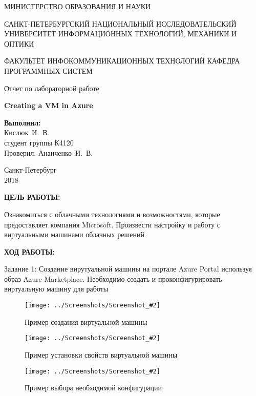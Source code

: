 \documentclass[14pt,a4paper]{extreport}
\newcommand{\screenshot}[2]{\begin{figure}[ht]%
\centering\texttt{[image: ../Screenshots/Screenshot\_\#2]}%
\caption{#1}%
\label{picture#2}%
\end{figure}%
}
\newcommand{\header}[1]{%
{
\fontsize{16pt}{14pt}\selectfont
\begin{center}
\textbf{\MakeUppercase{#1}:}
\end{center}
}
}
\newcommand{\prepod}{Ананченко~И.~В.}
\newcommand{\igork}{Кислюк~И.~В.}
\begin{document}
	\begin{titlepage}
	\begin{center}	
		\fontsize{14pt}{14pt}\selectfont
		МИНИСТЕРСТВО ОБРАЗОВАНИЯ И НАУКИ\\

		\vspace*{0.6\baselineskip}
		
		САНКТ-ПЕТЕРБУРГСКИЙ НАЦИОНАЛЬНЫЙ ИССЛЕДОВАТЕЛЬСКИЙ УНИВЕРСИТЕТ ИНФОРМАЦИОННЫХ ТЕХНОЛОГИЙ, МЕХАНИКИ И ОПТИКИ
		
		\vspace*{0.6\baselineskip}
		ФАКУЛЬТЕТ ИНФОКОММУНИКАЦИОННЫХ ТЕХНОЛОГИЙ
		КАФЕДРА ПРОГРАММНЫХ СИСТЕМ
	
		\vspace*{7\baselineskip}
		\fontsize{19pt}{18pt}\selectfont
		Отчет по лабораторной работе
		
		\fontsize{20pt}{18pt}\selectfont
		\textbf{Creating a VM in Azure}\\
		\vspace*{1.15\baselineskip}
		\end{center}
	
	\vspace*{2\baselineskip}
	\begin{flushright}
	\fontsize{14pt}{14pt}\selectfont
	\textbf{Выполнил:}\\
	\igork\\
	студент группы К4120\\
	Проверил: \prepod\\
	\end{flushright}
	
	\vspace{\fill}
	\begin{center}
	Санкт-Петербург\\
	2018
	\end{center}
	
\end{titlepage}

\newpage

\header{Цель работы}

\fontsize{14pt}{14pt}\selectfont

Ознакомиться с облачными технологиями и возможностями, которые предоставляет компания Microsoft. Произвести настройку и работу с виртуальными машинами облачных решений
\clearpage

\header{Ход работы}

Задание 1: Создание вирутуальной машины на портале Azure Portal используя образ Azure Marketplace. Необходимо создать и проконфигурировать виртуальную машину для работы
\screenshot{Пример создания виртуальной машины}{1}
\screenshot{Пример установки свойств виртуальной машины}{2}
\screenshot{Пример выбора необходимой конфигурации}{3}
\end{document}
